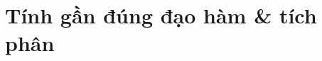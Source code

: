 \documentclass[../../Lectures]{subfiles}
\begin{document}
\chapter{Tính gần đúng đạo hàm \& tích phân}
\end{document}
